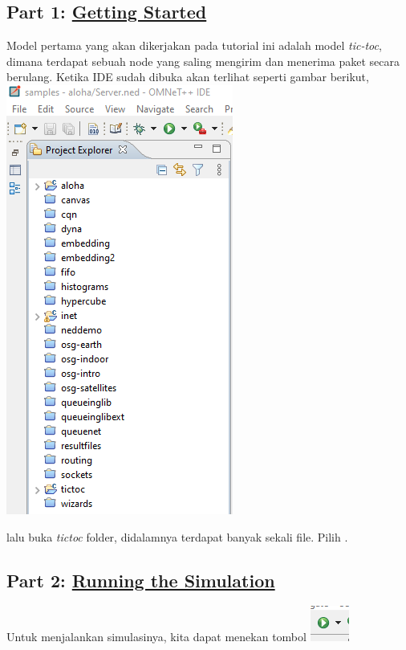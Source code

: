 \documentclass[conference]{IEEEtran}
\begin{document}
\subsection{Part 1: \href{https://docs.omnetpp.org/tutorials/tictoc/part1/}{Getting Started}}
Model pertama yang akan dikerjakan pada tutorial ini adalah model \textit{tic-toc}, dimana terdapat sebuah node yang saling mengirim dan menerima paket secara berulang. Ketika IDE sudah dibuka akan terlihat seperti gambar berikut,
\includegraphics[scale=0.9]{images/samples-directory.png}


lalu buka \textit{tictoc} folder, didalamnya terdapat banyak sekali file. Pilih .

\subsection{Part 2: \href{https://docs.omnetpp.org/tutorials/tictoc/part2/}{Running the Simulation}}
Untuk menjalankan simulasinya, kita dapat menekan tombol \break
\includegraphics[scale=0.9]{images/run-button.png}
\end{document}
